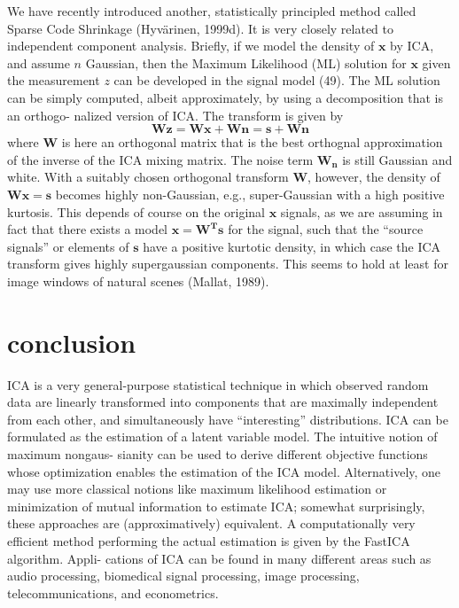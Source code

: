 \documentclass[12pt, a4paper, onecolumn]{IEEEtran}
\begin{document}
We have recently introduced another, statistically principled method called Sparse Code Shrinkage (Hyvärinen, 1999d). It is very closely related to independent component analysis. Briefly, if we model the density of $\mathbf{x}$ by ICA, and assume $n$ Gaussian, then the Maximum Likelihood (ML) solution for $\mathbf{x}$ given the measurement $z$ can be developed in the signal model (49).
The ML solution can be simply computed, albeit approximately, by using a decomposition that is an orthogo- nalized version of ICA. The transform is given by $$ \mathbf{Wz = Wx + Wn = s + Wn}$$ where $\mathbf{W}$ is here an orthogonal matrix that is the best orthognal approximation of the inverse of the ICA mixing matrix. The noise term $\mathbf{W_n}$ is still Gaussian and white. With a suitably chosen orthogonal transform $\mathbf{W}$, however, the density of $\mathbf{Wx = s}$ becomes highly non-Gaussian, e.g., super-Gaussian with a high positive kurtosis. This depends of course on the original $\mathbf{x}$ signals, as we are assuming in fact that there exists a model $\mathbf{x = W^Ts}$ for the signal, such that the “source signals” or elements of $\mathbf{s}$ have a positive kurtotic density, in which case the ICA transform gives highly supergaussian components. This seems to hold at least for image windows of natural scenes (Mallat, 1989).
\section{conclusion}
ICA is a very general-purpose statistical technique in which observed random data are linearly transformed into components that are maximally independent from each other, and simultaneously have “interesting” distributions. ICA can be formulated as the estimation of a latent variable model. The intuitive notion of maximum nongaus- sianity can be used to derive different objective functions whose optimization enables the estimation of the ICA model. Alternatively, one may use more classical notions like maximum likelihood estimation or minimization of mutual information to estimate ICA; somewhat surprisingly, these approaches are (approximatively) equivalent. A computationally very efficient method performing the actual estimation is given by the FastICA algorithm. Appli- cations of ICA can be found in many different areas such as audio processing, biomedical signal processing, image processing, telecommunications, and econometrics.
\end{document}
